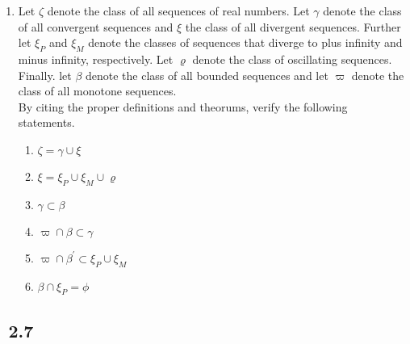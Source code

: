 \documentclass[11pt, letterpaper]{article}
\begin{document}
\begin{enumerate}
\item{Let $\zeta$ denote the class of all sequences of real numbers. Let $\gamma$ denote the class of all convergent sequences and $\xi$ the class of all divergent sequences. Further let $\xi_P$ and $\xi_M$ denote the classes of sequences that diverge to plus infinity and minus infinity, respectively. Let $\varrho$ denote the class of oscillating sequences. Finally. let $\beta$ denote the class of all bounded sequences and let $\varpi$ denote the class of all monotone sequences.\\ By citing the proper definitions and theorums, verify the following statements.
	\begin{enumerate}
		\item{$\zeta = \gamma \cup \xi$}
		\item{$\xi =  \xi_P \cup \xi_M \cup \varrho$}
		\item{$\gamma \subset \beta$}
		\item{$\varpi \cap \beta \subset \gamma$}
		\item{$\varpi \cap \beta^{'} \subset \xi_P \cup \xi_M$}
		\item{$\beta \cap \xi_P = \phi$}
	\end{enumerate}
}

\end{enumerate}
\clearpage

\subsection{\exr \, 2.7}
\end{document}
